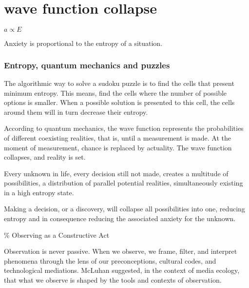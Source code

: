\chapter*{wave function collapse}
\begin{center}
\vspace{2cm}
\begin{flushright}
\large
\textit{ $a \propto E$ }
\end{flushright}
\vspace{2cm}
\end{center}
\normalsize

Anxiety is proportional to the entropy of a situation. 

\newpage  %
\subsection*{ Entropy, quantum mechanics and puzzles} 

The algorithmic way to solve a sudoku puzzle is to find the cells that present minimum entropy. This means, find the cells where the number of possible options is smaller. When a possible solution is presented to this cell, the cells around them will in turn decrease their entropy. 

According to quantum mechanics, the wave function represents the probabilities of different coexisting realities, that is, until a measurement is made. At the moment of measurement, chance is replaced by actuality. The wave function collapses, and reality is set.

Every unknown in life, every decision still not made, creates a multitude of possibilities, a distribution of parallel potential realities, simultaneously existing in a high entropy state. 

Making a decision, or a discovery, will collapse all possibilities into one, reducing entropy and in consequence reducing the associated anxiety for the unknown. 

{\scriptsize \textcolor{comment}{\%  Observing as a Constructive Act }}

Observation is never passive. When we observe, we frame, filter, and interpret phenomena through the lens of our preconceptions, cultural codes, and technological mediations. McLuhan suggested, in the context of media ecology, that what we observe is shaped by the tools and contexts of observation. 

